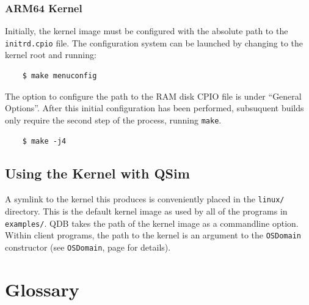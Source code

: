 \documentclass[letterpaper, 10pt]{book}
\begin{document}
\subsection{ARM64 Kernel}

Initially, the kernel image must be configured with the absolute path to the
\texttt{initrd.cpio} file. The configuration system can be launched by changing
to the kernel root and running:

\begin{verbatim}
    $ make menuconfig
\end{verbatim}

The option to configure the path to the RAM disk CPIO file is under ``General
Options''. After this initial configuration has been performed, subsuquent
builds only require the second step of the process, running \texttt{make}.

\begin{verbatim}
    $ make -j4
\end{verbatim}

\section{Using the Kernel with QSim}
A symlink to the kernel this produces is conveniently placed in the
\texttt{linux/} directory. This is the default kernel image as used by all of
the programs in \texttt{examples/}. QDB takes the path of the kernel image as a
commandline option. Within client programs, the path to the kernel is an
argument to the \texttt{OSDomain} constructor (see \texttt{OSDomain}, page 
\pageref{class:OSDomain} for details).

\chapter*{Glossary}
\end{document}
